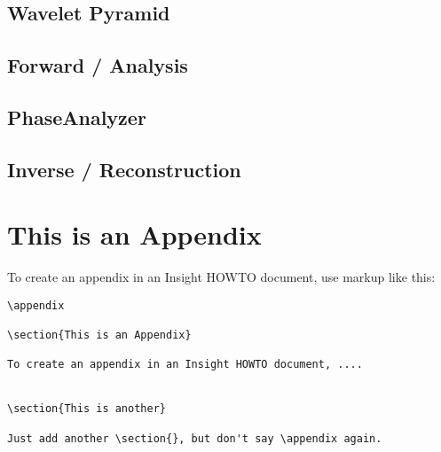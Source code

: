 \documentclass{InsightArticle}
\theoremstyle{definition}
\begin{document}
\subsection{Wavelet Pyramid}
\label{sub:Pyramid}

\subsection{Forward / Analysis}
\label{sub:Forward}

\subsection{PhaseAnalyzer}

\subsection{Inverse / Reconstruction}
\label{sub:Inverse}


\appendix

\section{This is an Appendix}

To create an appendix in an Insight HOWTO document, use markup like
this:

\begin{verbatim}
\appendix

\section{This is an Appendix}

To create an appendix in an Insight HOWTO document, ....


\section{This is another}

Just add another \section{}, but don't say \appendix again.
\end{verbatim}


%
%
\nocite{*} %
\twocolumn

\onecolumn
\end{document}
